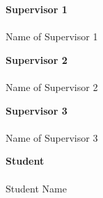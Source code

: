 \documentclass[12pt]{article}
\begin{document}
\begin{center}
\textbf{Supervisor 1} \\
\colorbox{signaturegray}{\makebox[0.45\textwidth]{
\raisebox{-35mm}{
\rule{5cm}{0.1pt}}}} \\
Name of Supervisor 1
\vspace{5mm}


\textbf{Supervisor 2} \\
\colorbox{signaturegray}{\makebox[0.45\textwidth]{
\raisebox{-35mm}{
\rule{5cm}{0.1pt}}}} \\
Name of Supervisor 2
\vspace{5mm}

\textbf{Supervisor 3} \\
\colorbox{signaturegray}{\makebox[0.45\textwidth]{
\raisebox{-35mm}{
\rule{5cm}{0.1pt}}}} \\
Name of Supervisor 3
\vspace{5mm}

\textbf{Student} \\
\colorbox{signaturegray}{\makebox[0.45\textwidth]{
\raisebox{-35mm}{
\rule{5cm}{0.1pt}}}} \\
Student Name
\end{center}
\end{document}
